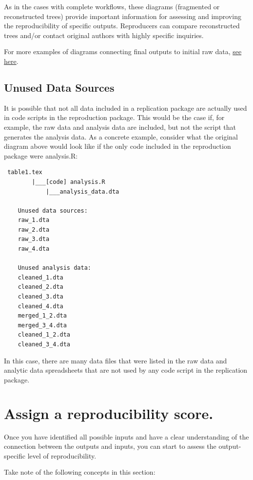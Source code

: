 \documentclass[]{book}
\begin{document}
As in the cases with complete workflows, these diagrams (fragmented or reconstructed trees) provide important information for assessing and improving the reproducibility of specific outputs. Reproducers can compare reconstructed trees and/or contact original authors with highly specific inquiries.

For more examples of diagrams connecting final outputs to initial raw data, \protect\hyperlink{additional-diagrams}{see here}.

\hypertarget{unused-data-sources}{%
\subsection{Unused Data Sources}\label{unused-data-sources}}

It is possible that not all data included in a replication package are actually used in code scripts in the reproduction package. This would be the case if, for example, the raw data and analysis data are included, but not the script that generates the analysis data. As a concrete example, consider what the original diagram above would look like if the only code included in the reproduction package were analysis.R:

\begin{verbatim}
 table1.tex
        |___[code] analysis.R
            |___analysis_data.dta

    Unused data sources:
    raw_1.dta
    raw_2.dta
    raw_3.dta
    raw_4.dta

    Unused analysis data:
    cleaned_1.dta
    cleaned_2.dta
    cleaned_3.dta
    cleaned_4.dta
    merged_1_2.dta
    merged_3_4.dta
    cleaned_1_2.dta
    cleaned_3_4.dta
\end{verbatim}

In this case, there are many data files that were listed in the raw data and analytic data spreadsheets that are not used by any code script in the replication package.

\hypertarget{score}{%
\section{Assign a reproducibility score.}\label{score}}

Once you have identified all possible inputs and have a clear understanding of the connection between the outputs and inputs, you can start to assess the output-specific level of reproducibility.

Take note of the following concepts in this section:
\end{document}
